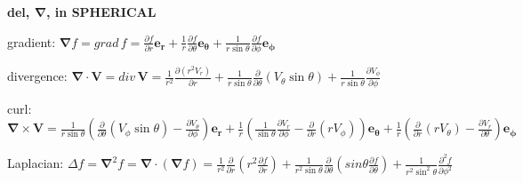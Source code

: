 \documentclass[letterpaper,landscape,10pt]{article}
\newenvironment{mydescription}
{\begin{description}
	\setlength{\itemsep}{0pt}
	\setlength{\parskip}{0pt}
	\setlength{\parsep}{-1pt}}
{\end{description}}
\begin{document}
{\begin{multicols}{3}
		\begin{center}\textbf{del, $\bm{\nabla}$, in SPHERICAL}\end{center}
		\begin{mydescription}
			\item[gradient:]
				$\bm{\nabla}f = grad\,f =
				\frac{\partial f}{\partial r}\bm{e_r} +
				\frac{1}{r}\frac{\partial f}{\partial \theta}\bm{e_\theta} +
				\frac{1}{r\sin\theta}\frac{\partial f}{\partial\phi}\bm{e_\phi}
				$
			\item[divergence:]
				$\bm{\nabla}\cdot\bm{V} = div\, \bm{V} =
				\frac{1}{r^2}\frac{\partial(r^2V_r)}{\partial r} +
				\frac{1}{r\sin\theta}\frac{\partial}{\partial\theta}\left({
				V_\theta\sin\theta}\right) +
				\frac{1}{r\sin\theta}\frac{\partial V_\phi}{\partial\phi}
				$
			\item[curl:]
				$\bm{\nabla}\times \bm{V} =
				\frac{1}{r\sin\theta}\left({ \frac{\partial}{\partial\theta}(V_\phi\sin\theta)-\frac{\partial V_\theta}{\partial\phi} }\right)\bm{e_r} +
				\frac{1}{r}\left({\frac{1}{\sin\theta}\frac{\partial V_r}{\partial\phi} - \frac{\partial}{\partial r}(r V_\phi) }\right) \bm{e_\theta} +
				\frac{1}{r}\left({\frac{\partial}{\partial r}(r V_\theta) -
				\frac{\partial V_r}{\partial\theta} }\right) \bm{e_\phi}
				$
			\item[Laplacian:]
				$\Delta f = \bm{\nabla}^2f =
				\bm{\nabla} \cdot (\bm{\nabla}f) =
				\frac{1}{r^2}\frac{\partial}{\partial r}\left( 
				r^2\frac{\partial f}{\partial r}\right) +
				\frac{1}{r^2\sin\theta}\frac{\partial}{\partial\theta}\left(
				sin\theta\frac{\partial f}{\partial\theta}\right) +
				\frac{1}{r^2\sin^2\theta}\frac{\partial^2f}{\partial\phi^2}
				$
		\end{mydescription}
		


\end{multicols}}
\end{document}
